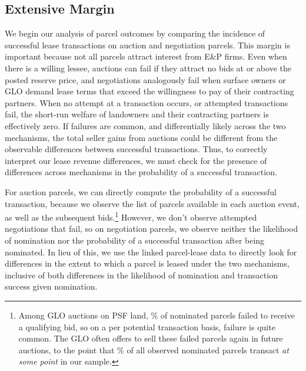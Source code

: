 \documentclass[12pt]{article}
\newcommand{\inputy}[1]{\unskip}
\begin{document}
\subsection{Extensive Margin \label{sec:ExtensiveMargin}}
We begin our analysis of parcel outcomes by comparing the incidence of successful lease transactions on auction and negotiation parcels.  This margin is important because not all parcels attract interest from E\&P firms. Even when there is a willing lessee, auctions can fail if they attract no bids at or above the posted reserve price, and negotiations analogously fail when surface owners or GLO demand lease terms that exceed the willingness to pay of their contracting partners.  When no attempt at a transaction occurs, or attempted transactions fail, the short-run welfare of landowners and their contracting partners is effectively zero. If failures are common, and differentially likely across the two mechanisms, the total seller gains from auctions could be different from the observable differences between successful transactions. Thus, to correctly interpret our lease revenue differences, we must check for the presence of differences across mechanisms in the probability of a successful transaction.

For auction parcels, we can directly compute the probability of a successful transaction, because we observe the list of parcels available in each auction event, as well as the subsequent bids.\footnote{Among GLO auctions on PSF land, \inputy{../output/estimates/tract_date_leased_share.tex}\% of nominated parcels failed to receive a qualifying bid, so on a per potential transaction basis, failure is quite common.  The GLO often offers to sell these failed parcels again in future auctions, to the point that \inputy{../output/estimates/tract_ever_leased_share.tex}\% of all observed nominated parcels transact \textit{at some point} in our sample.} However, we don't observe attempted negotiations that fail, so on negotiation parcels, we observe neither the likelihood of nomination nor the probability of a successful transaction after being nominated. In lieu of this, we use the linked parcel-lease data to directly look for differences in the extent to which a parcel is leased under the two mechanisms, inclusive of both differences in the likelihood of nomination and transaction success given nomination.  
\end{document}
